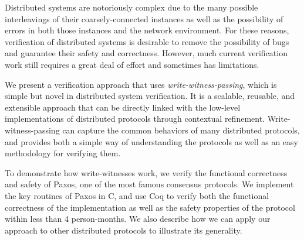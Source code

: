 Distributed systems are notoriously complex due to the many possible interleavings of their coarsely-connected instances as well as the possibility of errors in both  those instances and the network environment. For these reasons, verification of distributed systems is desirable to remove the possibility of bugs and guarantee their safety and correctness. However, much current verification work still requires a great deal of effort and sometimes has limitations.

We present a verification approach that uses \textit{write-witness-passing}, which is simple but novel in distributed system verification. It is a scalable, reusable, and extensible approach that can be directly linked with the low-level implementations of distributed protocols through contextual refinement. Write-witness-passing can capture the common behaviors of many distributed protocols, and provides both a simple way of understanding the protocols as well as an easy methodology for verifying them.

To demonstrate how write-witnesses work, we verify the functional correctness and safety of Paxos, one of the most famous consensus protocols. We implement the key routines of Paxos in C, and use Coq to verify both the functional correctness of the implementation as well as the safety properties of the protocol within less than 4 person-months. We also describe how we can apply our approach to other distributed protocols to illustrate its generality.
